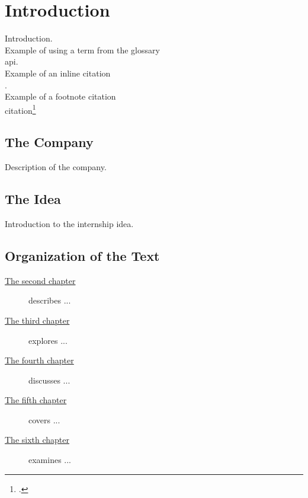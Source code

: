 \chapter{Introduction}
\label{chap:introduction}

Introduction.\\

\noindent Example of using a term from the glossary \\ 
\gls{api}. \\

\noindent Example of an inline citation \\ 
\cite{site:agile-manifesto}. \\

\noindent Example of a footnote citation \\ 
citation\footcite{womak:lean-thinking} \\

\section{The Company}

Description of the company.

\section{The Idea}

Introduction to the internship idea.

\section{Organization of the Text}

\begin{description}
    \item[{\hyperref[chap:literature-review]{The second chapter}}] describes ...
    
    \item[{\hyperref[chap:gap-analysis]{The third chapter}}] explores ...
    
    \item[{\hyperref[chap:System-Analysis-and-Design]{The fourth chapter}}] discusses ...
    
    \item[{\hyperref[chap:Methodology]{The fifth chapter}}] covers ...
    
    \item[{\hyperref[chap:conclusion]{The sixth chapter}}] examines ...
    
\end{description}

